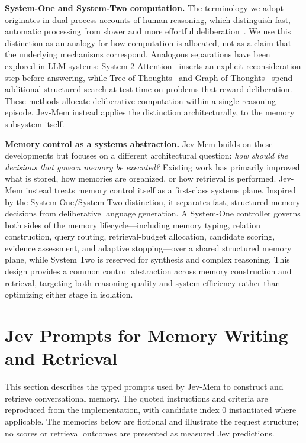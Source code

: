 \documentclass[11pt]{article}
\begin{document}
\noindent\textbf{System-One and System-Two computation.}
The terminology we adopt originates in dual-process accounts of human reasoning, which distinguish fast, automatic processing from slower and more effortful deliberation~\citep{evans2008dual}. We use this distinction as an analogy for how computation is allocated, not as a claim that the underlying mechanisms correspond. Analogous separations have been explored in LLM systems: System 2 Attention~\citep{weston2023system2attention} inserts an explicit reconsideration step before answering, while Tree of Thoughts~\citep{yao2023tot} and Graph of Thoughts~\citep{besta2024got} spend additional structured search at test time on problems that reward deliberation. These methods allocate deliberative computation within a single reasoning episode. Jev-Mem instead applies the distinction architecturally, to the memory subsystem itself.

\noindent\textbf{Memory control as a systems abstraction.}
Jev-Mem builds on these developments but focuses on a different architectural question: \emph{how should the decisions that govern memory be executed?} Existing work has primarily improved what is stored, how memories are organized, or how retrieval is performed. Jev-Mem instead treats memory control itself as a first-class systems plane. Inspired by the System-One/System-Two distinction, it separates fast, structured memory decisions from deliberative language generation. A System-One controller governs both sides of the memory lifecycle---including memory typing, relation construction, query routing, retrieval-budget allocation, candidate scoring, evidence assessment, and adaptive stopping---over a shared structured memory plane, while System Two is reserved for synthesis and complex reasoning. This design provides a common control abstraction across memory construction and retrieval, targeting both reasoning quality and system efficiency rather than optimizing either stage in isolation.


\section{Jev Prompts for Memory Writing and Retrieval}
\label{app:jev-prompts}

This section describes the typed prompts used by Jev-Mem to construct and retrieve conversational memory. The quoted instructions and criteria are reproduced from the implementation, with candidate index 0 instantiated where applicable. The memories below are fictional and illustrate the request structure; no scores or retrieval outcomes are presented as measured Jev predictions. 
\end{document}
